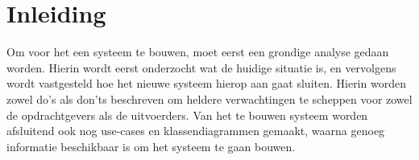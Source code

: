 \section{Inleiding}
\label{inleiding}

Om voor het \casamproject een systeem te bouwen,
moet eerst een grondige analyse gedaan worden.
Hierin wordt eerst onderzocht wat de huidige situatie is,
en vervolgens wordt vastgesteld hoe het nieuwe systeem hierop aan gaat sluiten.
Hierin worden zowel do's als don'ts beschreven om heldere verwachtingen te scheppen
voor zowel de opdrachtgevers als de uitvoerders.
Van het te bouwen systeem worden afsluitend ook nog use-cases en klassendiagrammen gemaakt,
waarna genoeg informatie beschikbaar is om het systeem te gaan bouwen.